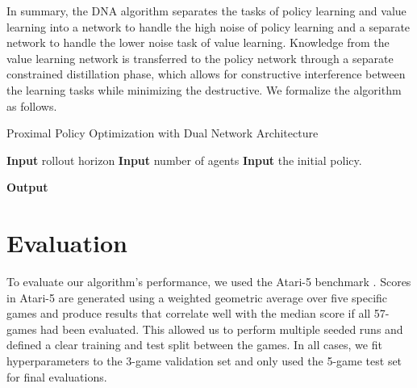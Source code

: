 \documentclass{article}
\begin{document}
In summary, the DNA algorithm separates the tasks of policy learning and value learning into a network to handle the high noise of policy learning and a separate network to handle the lower noise task of value learning. Knowledge from the value learning network is transferred to the policy network through a separate constrained distillation phase, which allows for constructive interference between the learning tasks while minimizing the destructive. We formalize the algorithm as follows.



\begin{algorithm}[H]
    \caption{Proximal Policy Optimization with Dual Network Architecture}
    \label{alg:ppo_dna}
    \begin{algorithmic}[1]
    \State \textbf{Input}  rollout horizon
    \State \textbf{Input}  number of agents
    \State \textbf{Input}  the initial policy.
        \EndFor
        
        
        
    
        \EndFor
    
        \EndFor
        
        \State{ }
    
        \EndFor
    \EndFor
    \State \textbf{Output} 
    \EndProcedure
    \end{algorithmic}
\end{algorithm}


\section{Evaluation}
\label{sec:evaluation}





To evaluate our algorithm's performance, we used the Atari-5 benchmark \cite{aitchison2022atari}. Scores in Atari-5 are generated using a weighted geometric average over five specific games and produce results that correlate well with the median score if all 57-games had been evaluated. This allowed us to perform multiple seeded runs and defined a clear training and test split between the games. In all cases, we fit hyperparameters to the 3-game validation set and only used the 5-game test set for final evaluations. 
\end{document}
